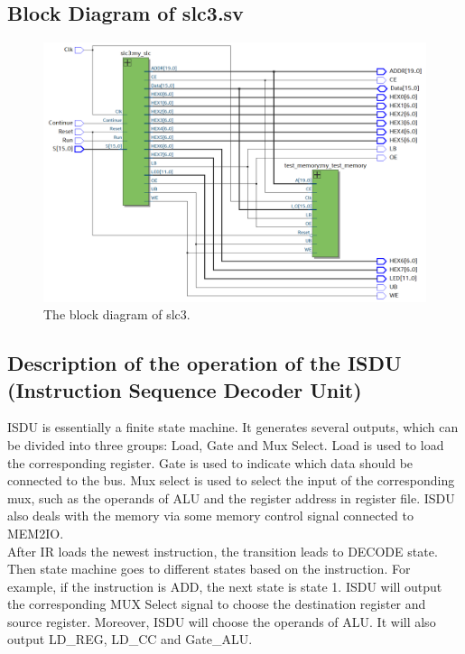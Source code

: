 \documentclass[12pt]{article}
\begin{document}
\subsection{Block Diagram of slc3.sv
}
\begin{figure}[H]
    \centering
    \includegraphics[width=15cm]{SLC3.png}
    \caption{The block diagram of slc3.}
\end{figure}

\subsection{Description of the operation of the ISDU (Instruction Sequence Decoder Unit)}
ISDU is essentially a finite state machine. It generates several outputs, which can be divided into three groups: Load, Gate and Mux Select. Load is used to load the corresponding register. Gate is used to indicate which data should be connected to the bus. Mux select is used to select the input of the corresponding mux, such as the operands of ALU and the register address in register file. ISDU also deals with the memory via some memory control signal connected to MEM2IO. \\

After IR loads the newest instruction, the transition leads to DECODE state. Then state machine goes to different states based on the instruction. For example, if the instruction is ADD, the next state is state 1. ISDU will output the corresponding MUX Select signal to choose the destination register and source register. Moreover, ISDU will choose the operands of ALU. It will also output LD\_REG, LD\_CC and Gate\_ALU. 
\end{document}
